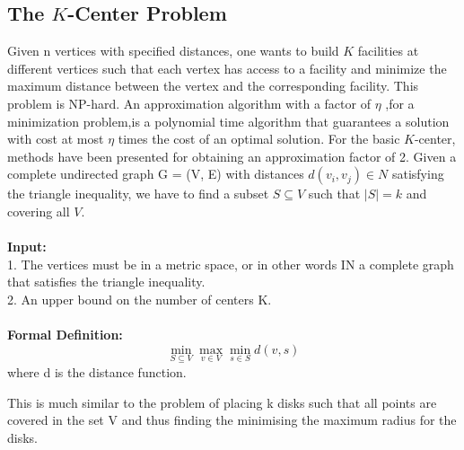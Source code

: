 \documentclass[12pt,a4paper,onecolumn]{article}
\begin{document}
\subsection{The $K$-Center Problem}
Given n vertices with specified distances, one wants to build $K$ facilities at different vertices such that each vertex has access to a facility and minimize the maximum distance between the vertex and the corresponding facility. This problem is NP-hard. An approximation algorithm with a factor of $\eta$ ,for a minimization problem,is a polynomial time algorithm that guarantees a solution with cost at most $\eta$ times the cost of an optimal solution. For the basic $K$-center, methods have been presented for obtaining an approximation factor of 2. Given a complete undirected graph G = (V, E) with distances $d(v_i, v_j) \in N$ satisfying the triangle inequality, we have to find a subset $S \subseteq V$ such that $|S| = k$ and covering all $V$.\\\\
 \textbf{Input:}\\1. The vertices must be in a metric space, or in other words IN a complete graph that satisfies the triangle inequality.\\2. An upper bound on the number of centers K.\\\\
\textbf{Formal Definition:}\\
$$\min_{S \subseteq V}\max_{v \in V}\min_{s \in S}d(v,s)$$
where d is the distance function.

This is much similar to the problem of placing k disks such that all points are covered in the set V and thus finding the minimising the maximum radius for the disks.

\end{document}

